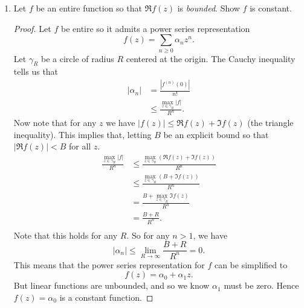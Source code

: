 \documentclass{article}
\begin{document}
\begin{enumerate}
\begin{proof}
		The coefficient of $z^1$ is
		\begin{align*}
			-\frac{1}{2} \left ( \frac{1}{8} + \frac{1}{16} + \frac{1}{32} + \cdots \right ) &= - \frac{1}{2} \left ( 2 - 1 - \frac{1}{2} - \frac{1}{4} \right )\\
			&= - \frac{1}{8}.
		\end{align*}
		 
		Therefore \[ f(z) = \cdots - \frac{1}{2z} - \frac{1}{4} - \frac{z}{8} + \cdots \]
	\end{proof}
	
Note that there is also a Laurent series which converges for the annulus $0 < |z| < 1$. This can be found by using the geometric series expansion \[\frac{1}{z-1} = \frac{-1}{1-z} = - \sum_{n=0}^\infty z^n\] which of course converges for $|z|< 1$, and using the same expansion of $\frac{1}{z-2}$ as above. The expansion which converges on the punctured unit disk is the one provided by SageMath. For another example of this, see \href{https://math.stackexchange.com/questions/2553132/laurent-series-for-different-domains}{this math StackExchange post}.

\item Let $f$ be an entire function so that $\Re f(z)$ is \emph{bounded}. Show $f$ is constant.

\begin{proof}
Let $f$ be entire so it admits a power series representation 
\[ f(z) = \sum_{n \geq 0 } \alpha_n z^n.\]
Let $\gamma_R$ be a circle of radius $R$ centered at the origin.
The Cauchy inequality tells us that
\begin{align*}
|\alpha_n| &= \frac{|f^{(n)}(0)|}{n!}\\
&\leq \frac{\max_{z \in \gamma_R}| f|}{R^n}.
\end{align*} 
Now note that for any $z$ we have $|f(z)| \leq \Re f(z) + \Im f(z)$ (the triangle inequality).
This implies that, letting $B$ be an explicit bound so that $|\Re f(z)| < B$ for all $z$.
\begin{align*}
\frac{\max_{z \in \gamma_R} |f|}{R^n} &\leq \frac{\max_{z \in \gamma_R} (\Re f(z) + \Im f(z))}{R^n}\\
& \leq \frac{ \max_{z \in \gamma_R} (B + \Im f(z))}{R^n}\\
& = \frac{B + \max_{z \in \gamma_R} \Im f(z)}{R^n}\\
& = \frac{B + R}{R^n}.\\
\end{align*}
Note that this holds for any $R$. So for any $n > 1$, we have
\[ |\alpha_n| \leq \lim_{R \rightarrow \infty} \frac{B + R }{R^n} = 0.\]
This means that the power series representation for $f$ can be simplified to
\[ f(z) = \alpha_0 + \alpha_1 z.\]
But linear functions are unbounded, and so we know $\alpha_1$ must be zero.
Hence $f(z) = \alpha_0$ is a constant function.
\end{proof}


\end{enumerate}
\end{document}
